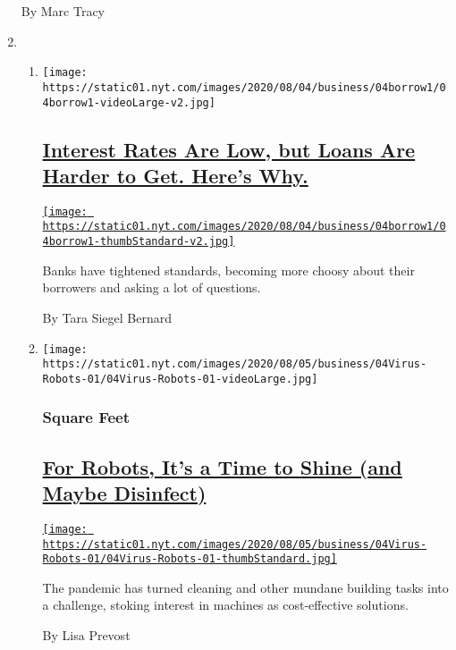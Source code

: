 \begin{enumerate}
  By Marc Tracy
\item
  \begin{enumerate}
  \def\labelenumii{\arabic{enumii}.}
  \item
    \texttt{[image: https://static01.nyt.com/images/2020/08/04/business/04borrow1/04borrow1-videoLarge-v2.jpg]}

    \hypertarget{interest-rates-are-low-but-loans-are-harder-to-get-heres-why}{%
    \subsection{\texorpdfstring{\href{/2020/08/04/your-money/mortgage-loans-credit-cards-coronavirus.html}{Interest
    Rates Are Low, but Loans Are Harder to Get. Here's
    Why.}}{Interest Rates Are Low, but Loans Are Harder to Get. Here's Why.}}\label{interest-rates-are-low-but-loans-are-harder-to-get-heres-why}}

    \href{/2020/08/04/your-money/mortgage-loans-credit-cards-coronavirus.html}{\texttt{[image: https://static01.nyt.com/images/2020/08/04/business/04borrow1/04borrow1-thumbStandard-v2.jpg]}}

    Banks have tightened standards, becoming more choosy about their
    borrowers and asking a lot of questions.

    By Tara Siegel Bernard
  \item
    \texttt{[image: https://static01.nyt.com/images/2020/08/05/business/04Virus-Robots-01/04Virus-Robots-01-videoLarge.jpg]}

    \hypertarget{square-feet}{%
    \subsubsection{Square Feet}\label{square-feet}}

    \hypertarget{for-robots-its-a-time-to-shine-and-maybe-disinfect}{%
    \subsection{\texorpdfstring{\href{/2020/08/04/business/robot-cleaning-coronavirus.html}{For
    Robots, It's a Time to Shine (and Maybe
    Disinfect)}}{For Robots, It's a Time to Shine (and Maybe Disinfect)}}\label{for-robots-its-a-time-to-shine-and-maybe-disinfect}}

    \href{/2020/08/04/business/robot-cleaning-coronavirus.html}{\texttt{[image: https://static01.nyt.com/images/2020/08/05/business/04Virus-Robots-01/04Virus-Robots-01-thumbStandard.jpg]}}

    The pandemic has turned cleaning and other mundane building tasks
    into a challenge, stoking interest in machines as cost-effective
    solutions.

    By Lisa Prevost
  \end{enumerate}
\end{enumerate}


